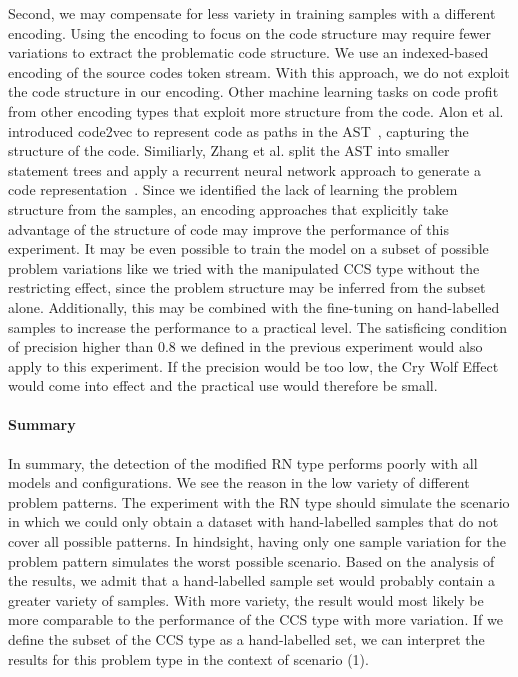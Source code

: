 Second, we may compensate for less variety in training samples with a different encoding. Using the encoding to focus on the code structure may require fewer variations to extract the problematic code structure. We use an indexed-based encoding of the source codes token stream. With this approach, we do not exploit the code structure in our encoding. Other machine learning tasks on code profit from other encoding types that exploit more structure from the code. Alon et al. introduced code2vec to represent code as paths in the AST~\cite{alon_code2vec_2018}, capturing the structure of the code. Similiarly, Zhang et al. split the AST into smaller statement trees and apply a recurrent neural network approach to generate a code representation~\cite{zhang_novel_2019}.
Since we identified the lack of learning the problem structure from the samples, an encoding approaches that explicitly take advantage of the structure of code may improve the performance of this experiment. It may be even possible to train the model on a subset of possible problem variations like we tried with the manipulated CCS type without the restricting effect, since the problem structure may be inferred from the subset alone.
Additionally, this may be combined with the fine-tuning on hand-labelled samples to increase the performance to a practical level. The satisficing condition of precision higher than 0.8 we defined in the previous experiment would also apply to this experiment. 
If the precision would be too low, the Cry Wolf Effect would come into effect and the practical use would therefore be small.

\paragraph{Summary}
In summary, the detection of the modified RN type performs poorly with all models and configurations. We see the reason in the low variety of different problem patterns. The experiment with the RN type should simulate the scenario in which we could only obtain a dataset with hand-labelled samples that do not cover all possible patterns. In hindsight, having only one sample variation for the problem pattern simulates the worst possible scenario. Based on the analysis of the results, we admit that a hand-labelled sample set would probably contain a greater variety of samples. With more variety, the result would most likely be more comparable to the performance of the CCS type with more variation. If we define the subset of the CCS type as a hand-labelled set, we can interpret the results for this problem type in the context of scenario (1). 

